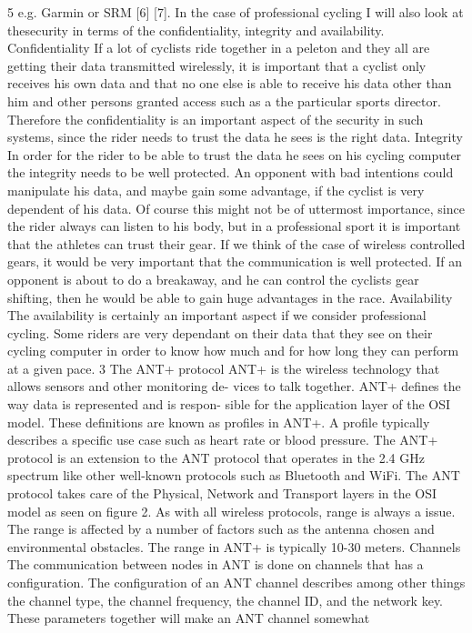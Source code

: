 5
e.g. Garmin or SRM [6] [7]. In the case of professional cycling I will also look at thesecurity in terms of the confidentiality, integrity and availability.
Confidentiality If a lot of cyclists ride together in a peleton and they all are getting their data transmitted wirelessly, it is important that a cyclist only receives his own data and that no one else is able to receive his data other than him and other persons granted access such as a the particular sports director. Therefore the confidentiality is an important aspect of the security in such systems, since the rider needs to trust the data he sees is the right data.
Integrity In order for the rider to be able to trust the data he sees on his cycling computer the integrity needs to be well protected. An opponent with bad intentions could manipulate his data, and maybe gain some advantage, if the cyclist is very dependent of his data. Of course this might not be of uttermost importance, since the rider always can listen to his body, but in a professional sport it is important that the athletes can trust their gear. If we think of the case of wireless controlled gears, it would be very important that the communication is well protected. If an opponent is about to do a breakaway, and he can control the cyclists gear shifting, then he would be able to gain huge advantages in the race.
Availability The availability is certainly an important aspect if we consider professional cycling. Some riders are very dependant on their data that they see on their cycling computer in order to know how much and for how long they can perform at a given pace.
3 The ANT+ protocol
ANT+ is the wireless technology that allows sensors and other monitoring de- vices to talk together. ANT+ defines the way data is represented and is respon- sible for the application layer of the OSI model. These definitions are known as profiles in ANT+. A profile typically describes a specific use case such as heart rate or blood pressure. The ANT+ protocol is an extension to the ANT protocol that operates in the 2.4 GHz spectrum like other well-known protocols such as Bluetooth and WiFi. The ANT protocol takes care of the Physical, Network and Transport layers in the OSI model as seen on figure 2. As with all wireless protocols, range is always a issue. The range is affected by a number of factors such as the antenna chosen and environmental obstacles. The range in ANT+ is typically 10-30 meters.
Channels The communication between nodes in ANT is done on channels that has a configuration. The configuration of an ANT channel describes among other things the channel type, the channel frequency, the channel ID, and the network key. These parameters together will make an ANT channel somewhat
